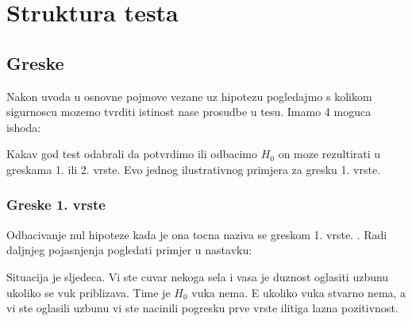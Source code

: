 \chapter{Struktura testa}

\section{Greske}

Nakon uvoda u osnovne pojmove vezane uz hipotezu pogledajmo s kolikom sigurnoscu mozemo tvrditi istinost nase prosudbe u tesu. Imamo 4 moguca ishoda:


\begin{table}[h]
\end{table}

Kakav god test odabrali da potvrdimo ili odbacimo $H_0$ on moze rezultirati u greskama 1. ili 2. vrste. Evo jednog ilustrativnog primjera za gresku 1. vrste.

\subsection{Greske 1. vrste}

Odbacivanje nul hipoteze kada je ona tocna naziva se greskom 1. vrste. \cite{engstat}. Radi daljnjeg pojasnjenja pogledati primjer u nastavku:

Situacija je sljedeca. Vi ste cuvar nekoga sela i vasa je duznost oglasiti uzbunu ukoliko se vuk priblizava. Time je $H_0$ vuka nema. E ukoliko vuka stvarno nema, a vi ste oglasili uzbunu vi ste nacinili pogresku prve vrste ilitiga lazna pozitivnost.

